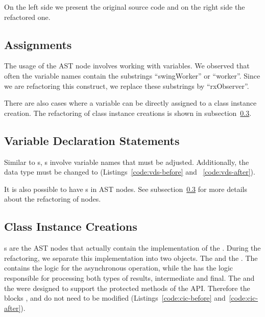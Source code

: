 \documentclass[type=bsc,accentcolor=tud9c]{tudthesis}
\begin{document}
On the left side we present the original source code and on the right side the refactored one.

\subsection{Assignments}
\label{sec:imp-assigments}
The usage of the AST node  involves working with variables. We observed that often the variable names contain the substrings ``swingWorker'' or     ``worker''. Since we are refactoring this construct, we replace these substrings by ``rxObserver''.



There are also cases where a variable can be directly assigned to a class instance creation. The refactoring of class instance creations is shown in subsection~\ref{sec:imp-class-instance-creations}.

\subsection{Variable Declaration Statements}
\label{sec:imp-variableDeclStatement}
Similar to s, s involve variable names that must be adjusted. Additionally, the data type  must be changed to  (Listings~\ref{code:vds-before} and ~\ref{code:vds-after}).



It is also possible to have s in  AST nodes. See subsection~\ref{sec:imp-class-instance-creations} for more details about the refactoring of  nodes.

\subsection{Class Instance Creations}
\label{sec:imp-class-instance-creations}
s are the AST nodes that actually contain the implementation of the . During the refactoring, we separate this implementation into two objects. The  and the . The  contains the logic for the asynchronous operation, while the  has the logic responsible for processing both types of results, intermediate and final. The  and the  were designed to support the protected methods of the  API. Therefore the blocks ,  and  do not need to be modified (Listings~\ref{code:cic-before} and~\ref{code:cic-after}).
\end{document}
